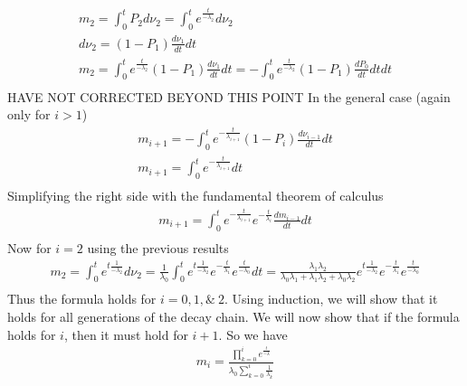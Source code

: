 \documentclass[12pt]{article}
\begin{document}
\begin{equation}
\begin{split}
m_2 = \int_0^t P_2d\nu_{2} = \int_0^t e^{\frac{t}{-\lambda_2}}d\nu_2\\
d\nu_{2} = (1-P_{1})\frac{d\nu_{1}}{dt}dt\\
m_2 = \int_0^t e^{\frac{t}{-\lambda_2}}(1-P_{1})\frac{d\nu_{1}}{dt}dt = -\int_0^t e^{\frac{t}{-\lambda_2}}(1-P_{1})\frac{dP_0}{dt}dtdt\\
\end{split}
\end{equation}
HAVE NOT CORRECTED BEYOND THIS POINT \hline In the general case (again only for $i>1$)
\begin{equation}
\begin{split}
m_{i+1} = -\int_0^t e^{-\frac{t}{\lambda_{i+1}}}(1-P_{i})\frac{d\nu_{i-1}}{dt}dt\\
m_{i+1} = \int_0^t e^{-\frac{t}{\lambda_{i+1}}}dt\\
\end{split}
\end{equation}
Simplifying the right side with the fundamental theorem of calculus
\begin{equation}
\begin{split}
m_{i+1} = \int_0^t e^{-\frac{t}{\lambda_{i+1}}} e^{-\frac{t}{\lambda_{i}}}\frac{dm_{i-1}}{dt}dt\\
\end{split}
\end{equation}
Now for $i=2$ using the previous results
\begin{equation}
\begin{split}
m_2 = \int_0^t e^{t\frac{1}{-\lambda_2}}d\nu_2 
 = \frac{1}{\lambda_0}\int_0^t e^{t\frac{1}{-\lambda_2}}e^{-\frac{t}{\lambda_{1}}}e^{\frac{t}{-\lambda_0}}dt =
 \frac{\lambda_1\lambda_2}{\lambda_0\lambda_1+\lambda_1\lambda_2+\lambda_0\lambda_2} e^{t\frac{1}{-\lambda_2}}e^{-\frac{t}{\lambda_{1}}}e^{\frac{t}{-\lambda_0}}\\
\end{split}
\end{equation}
Thus the formula holds for $i=0,1,\& \ 2$. Using induction, we will show that it holds for all generations of the decay chain. We will now show that if the formula holds for $i$, then it must hold for $i+1$. 
So we have
\begin{equation}
\begin{split}
m_i = \frac{\prod_{k=0}^ie^{\frac{t}{-\lambda}}}{\lambda_0\sum_{k=0}^i\frac{1}{\lambda_k}}\\
\end{split}
\end{equation}
\end{document}
